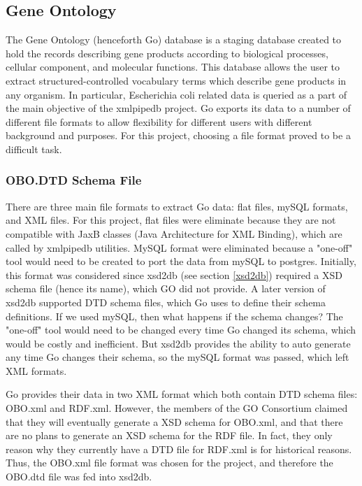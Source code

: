 \documentclass[12pt]{article}
\begin{document}
\subsection{Gene Ontology}
The Gene Ontology (henceforth Go) database is a staging database created to hold the records describing gene products according to biological processes,
cellular component, and molecular functions. This database allows the user to extract structured-controlled vocabulary terms
which describe gene products in any organism. In particular, Escherichia coli related data is queried as a part of the main
objective of the xmlpipedb project. Go exports its data to a number of different file formats to allow flexibility for different users with
different background and purposes. For this project, choosing a file format proved to be a difficult task.

\subsubsection{OBO.DTD Schema File}
\label{godtd}
There are three main file formats to extract Go data: flat files, mySQL formats, and XML files. For this project,
flat files were eliminate because they are not compatible with JaxB classes (Java Architecture for XML Binding), which  are called by
xmlpipedb utilities. MySQL format were eliminated because a "one-off" tool would need
to be created to port the data from mySQL to postgres. Initially, this format was considered since xsd2db
(see section \ref{xsd2db}) required a XSD
schema file (hence its name), which GO did not provide. A later version of xsd2db supported DTD schema files, which Go uses to define their
schema definitions. If we used mySQL, then what happens if the schema changes? The "one-off" tool would need to be changed every
time Go changed its schema, which would be costly and inefficient. But xsd2db provides the ability to auto generate any time Go changes
their schema, so the mySQL format was passed, which left XML formats.

Go provides their data in two XML format which both contain DTD schema files: OBO.xml and RDF.xml. However,
the members of the GO Consortium claimed that they will eventually generate a XSD schema for OBO.xml, and that there
are no plans to generate an XSD schema for the RDF file. In fact, they only reason why they currently have a DTD file
for RDF.xml is for historical reasons. Thus, the OBO.xml file format
was chosen for the project, and therefore the OBO.dtd file was fed into xsd2db.
\end{document}
